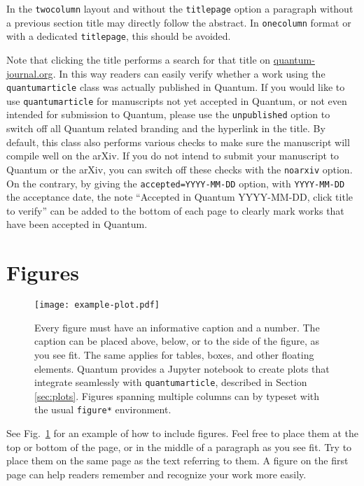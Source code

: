 \documentclass[a4paper,twocolumn,11pt,accepted=2017-05-09]{quantumarticle}
\begin{document}
In the \texttt{twocolumn} layout and without the \texttt{titlepage} option a paragraph without a previous section title may directly follow the abstract.
In \texttt{onecolumn} format or with a dedicated \texttt{titlepage}, this should be avoided.

Note that clicking the title performs a search for that title on \href{http://quantum-journal.org}{quantum-journal.org}.
In this way readers can easily verify whether a work using the \texttt{quantumarticle} class was actually published in Quantum.
If you would like to use \texttt{quantumarticle} for manuscripts not yet accepted in Quantum, or not even intended for submission to Quantum, please use the \texttt{unpublished} option to switch off all Quantum related branding and the hyperlink in the title.
By default, this class also performs various checks to make sure the manuscript will compile well on the arXiv.
If you do not intend to submit your manuscript to Quantum or the arXiv, you can switch off these checks with the \texttt{noarxiv} option.
On the contrary, by giving the \texttt{accepted=YYYY-MM-DD} option, with \texttt{YYYY-MM-DD} the acceptance date, the note ``Accepted in Quantum YYYY-MM-DD, click title to verify'' can be added to the bottom of each page to clearly mark works that have been accepted in Quantum.

\section{Figures}
\begin{figure}[t]
  \centering
  \texttt{[image: example-plot.pdf]}
  \caption{Every figure must have an informative caption and a number.
    The caption can be placed above, below, or to the side of the figure, as you see fit.
    The same applies for tables, boxes, and other floating elements.
    Quantum provides a Jupyter notebook to create plots that integrate seamlessly with \texttt{quantumarticle}, described in Section \ref{sec:plots}.
    Figures spanning multiple columns can by typeset with the usual \texttt{figure*} environment.}
  \label{fig:figure1}
\end{figure}
See Fig.~\ref{fig:figure1} for an example of how to include figures.
Feel free to place them at the top or bottom of the page, or in the middle of a paragraph as you see fit.
Try to place them on the same page as the text referring to them.
A figure on the first page can help readers remember and recognize your work more easily.
\end{document}
